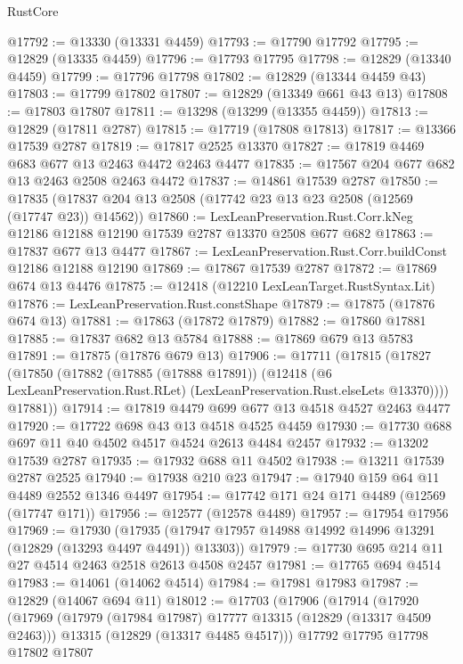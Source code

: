 \begin{lexlean}{RustCore}
\begin{coremodule}
@17792 := @13330 (@13331 @4459)
@17793 := @17790 @17792
@17795 := @12829 (@13335 @4459)
@17796 := @17793 @17795
@17798 := @12829 (@13340 @4459)
@17799 := @17796 @17798
@17802 := @12829 (@13344 @4459 @43)
@17803 := @17799 @17802
@17807 := @12829 (@13349 @661 @43 @13)
@17808 := @17803 @17807
@17811 := @13298 (@13299 (@13355 @4459))
@17813 := @12829 (@17811 @2787)
@17815 := @17719 (@17808 @17813)
@17817 := @13366 @17539 @2787
@17819 := @17817 @2525 @13370
@17827 := @17819 @4469 @683 @677 @13 @2463 @4472 @2463 @4477
@17835 := @17567 @204 @677 @682 @13 @2463 @2508 @2463 @4472
@17837 := @14861 @17539 @2787
@17850 := @17835 (@17837 @204 @13 @2508 (@17742 @23 @13 @23 @2508 (@12569 (@17747 @23)) @14562))
@17860 := LexLeanPreservation.Rust.Corr.kNeg
    @12186
    @12188
    @12190
    @17539
    @2787
    @13370
    @2508
    @677
    @682
@17863 := @17837 @677 @13 @4477
@17867 := LexLeanPreservation.Rust.Corr.buildConst @12186 @12188 @12190
@17869 := @17867 @17539 @2787
@17872 := @17869 @674 @13 @4476
@17875 := @12418 (@12210 LexLeanTarget.RustSyntax.Lit)
@17876 := LexLeanPreservation.Rust.constShape
@17879 := @17875 (@17876 @674 @13)
@17881 := @17863 (@17872 @17879)
@17882 := @17860 @17881
@17885 := @17837 @682 @13 @5784
@17888 := @17869 @679 @13 @5783
@17891 := @17875 (@17876 @679 @13)
@17906 := @17711
    (@17815
      (@17827
        (@17850
          (@17882
            (@17885 (@17888 @17891))
            (@12418 (@6 LexLeanPreservation.Rust.RLet) (LexLeanPreservation.Rust.elseLets @13370))))
        @17881))
@17914 := @17819 @4479 @699 @677 @13 @4518 @4527 @2463 @4477
@17920 := @17722 @698 @43 @13 @4518 @4525 @4459
@17930 := @17730 @688 @697 @11 @40 @4502 @4517 @4524 @2613 @4484 @2457
@17932 := @13202 @17539 @2787
@17935 := @17932 @688 @11 @4502
@17938 := @13211 @17539 @2787 @2525
@17940 := @17938 @210 @23
@17947 := @17940 @159 @64 @11 @4489 @2552 @1346 @4497
@17954 := @17742 @171 @24 @171 @4489 (@12569 (@17747 @171))
@17956 := @12577 (@12578 @4489)
@17957 := @17954 @17956
@17969 := @17930
    (@17935 (@17947 @17957 @14988 @14992 @14996 @13291 (@12829 (@13293 @4497 @4491)) @13303))
@17979 := @17730 @695 @214 @11 @27 @4514 @2463 @2518 @2613 @4508 @2457
@17981 := @17765 @694 @4514
@17983 := @14061 (@14062 @4514)
@17984 := @17981 @17983
@17987 := @12829 (@14067 @694 @11)
@18012 := @17703
    (@17906
      (@17914
        (@17920
          (@17969
            (@17979 (@17984 @17987) @17777 @13315 (@12829 (@13317 @4509 @2463)))
            @13315
            (@12829 (@13317 @4485 @4517)))
          @17792
          @17795
          @17798
          @17802
          @17807

\end{coremodule}
\end{lexlean}
